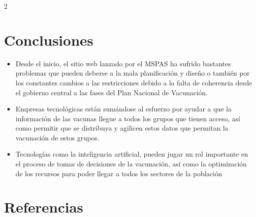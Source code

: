 \documentclass[12pt,spanish,Letterpaper,openany]{book}
\begin{document}
\begin {multicols}{2}
\hypertarget{conclusiones}{%
\section{Conclusiones}\label{conclusiones}}

\begin{itemize}
\item
  Desde el inicio, el sitio web lanzado por el MSPAS ha sufrido bastantes problemas
  que pueden deberse a la mala planificación y diseño o también por los constantes
  cambios a las restricciones debido a la falta de coherencia desde el gobierno central
  a las fases del Plan Nacional de Vacunación.
\item
  Empresas tecnológicas están sumándose al esfuerzo por ayudar a que la información
  de las vacunas llegue a todos los grupos que tienen acceso, así como permitir que se
  distribuya y agilicen estos datos que permitan la vacunación de estos grupos.
\item
  Tecnologías como la inteligencia artificial, pueden jugar un rol importante en el
  proceso de tomas de decisiones de la vacunación, así como la optimización de los
  recursos para poder llegar a todos los sectores de la población
\end{itemize}

\hypertarget{referencias}{%
\section{Referencias}\label{referencias}}


\end{multicols}
\end{document}
